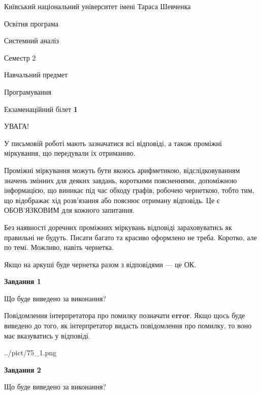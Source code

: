 \documentclass[12pt, ukrainian]{article}
\begin{document}
{{\begin {small}\par
{ \center  Київський національний університет імені Тараса Шевченка \par}
{\parbox {5 cm}{Освітня програма \hfill}{\parbox {7 cm}{Системний аналіз \hfill}}\parbox {6 cm}{\hfill Семестр 2}}\par
{\parbox {5 cm} {Навчальний предмет \hfill}\parbox {7 cm}{Програмування \hfill}\parbox {6cm}{\hfill}\par}\vspace{-7pt} \end{small}}{\center Екзаменаційний білет \No \textbf
{ 1 }\par}}
{
\begin {large}
УВАГА!

У письмовій роботі мають зазначатися всі відповіді, а також проміжні міркування, що передували їх отриманню.

Проміжні міркування можуть бути якоюсь арифметикою, відслідковуванням зна\-чень змінних для деяких завдань,
короткими поясненнями, допоміжною інформацією, що виникає під час обходу графів, робочею чернеткою,
тобто тим, що відображає хід розв’язання або пояснює отриману відповідь.
Це є ОБОВ’ЯЗКОВИМ для кожного запитання.

Без наявності доречних проміжних міркувань відповіді зараховуватись як правиль\-ні не будуть.
Писати багато та красиво оформлено не треба. Коротко, але по темі. Можли\-во, навіть чернетка.

Якщо на аркуші буде чернетка разом з відповідями --- це ОК.

\newpage

{\begin {center}\textbf{Завдання 1}\end {center}}\par
Що буде виведено за виконання?

Повідомлення інтерпретатора про помилку позначати \textbf{error}.
Якщо щось буде виведено до того, як інтерпретатор видасть повідомлення про помилку, 
то воно має вказуватись у відповіді. \par


\begin{center}
	{../pict/75_1.png}
\end{center}
\newpage

{\begin {center}\textbf{Завдання 2}\end {center}}\par
Що буде виведено за виконання?


\end{large}}
\end{document}
